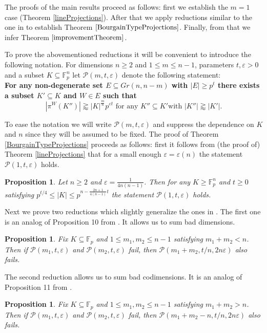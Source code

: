 \documentclass{amsart}
\newtheorem{proposition}[theorem]{Proposition}
\newcommand{\F}{\mathbb F}
\begin{document}
The proofs of the main results proceed as follows: first we establish the $m = 1$ case (Theorem \ref{lineProjections}). After that we apply reductions similar to the one in \cite{He18} to establish Theorem $\ref{BourgainTypeProjections}$. Finally, from that we infer Theorem $\ref{improvementTheorem}$.


To prove the abovementioned reductions it will be convenient to introduce the following notation. For dimensions $n \geq 2$ and $1 \leq m \leq n - 1$, parameters $t, \varepsilon > 0$ and a subset $K \subseteq \F_p^n$ let $\mathcal{P}(m, t, \varepsilon)$ denote the following statement: \\
\textbf{For any non-degenerate set $E \subseteq Gr(n, n - m)$ with $|E| \geq p^t$ there exists a subset $K' \subseteq K$ and $W \in E$ such that $$|\pi^{W}(K'')| \gtrapprox|K|^\frac{m}{n} p^{\varepsilon t} \text{ for any } K'' \subseteq K' \text {with } |K''| \gtrapprox |K'|.$$}

To ease the notation we will write $\mathcal{P}(m, t, \varepsilon)$ and suppress the dependence on $K$ and $n$ since they will be assumed to be fixed. The proof of Theorem \ref{BourgainTypeProjections} proceeds as follows: first it follows from (the proof of) Theorem \ref{lineProjections} that for a small enough $\varepsilon = \varepsilon(n)$ the statement $\mathcal{P}(1, t, \varepsilon)$ holds. 

\begin{proposition}\label{baseCase}
    Let $n \geq 2$ and $\varepsilon = \frac{1}{4n(n - 1)}$. Then for any $K \geq \F_p^n$ and $t \geq 0$ satisfying $p^{t/4} \leq |K| \leq p^{n - \frac{2n + 1}{4(n - 1)}t}$ the statement $\mathcal{P}(1, t, \varepsilon)$ holds. 
\end{proposition}

Next we prove two reductions which slightly generalize the ones in \cite{He18}.
The first one is an analog of Proposition 10 from \cite{He18}. It allows us to sum bad dimensions.

\begin{proposition}\label{additionofDimensionsProposition}
    Fix $K \subseteq \F_p$ and $1 \leq m_1, m_2 \leq n - 1$ satisfying $m_1 + m_2 < n$. Then if $\mathcal{P}(m_1, t, \varepsilon)$ and $\mathcal{P}(m_2, t, \varepsilon)$ fail, then $\mathcal{P}(m_1 + m_2, t/n, 2n\varepsilon)$ also fails.
\end{proposition}

The second reduction allows us to sum bad codimensions. It is an analog of Proposition 11 from \cite{He18}.
\begin{proposition}\label{additionofCodimensionsProposition}
Fix $K \subseteq \F_p$ and $1 \leq m_1, m_2 \leq n - 1$ satisfying $m_1 + m_2 > n$. Then if $\mathcal{P}(m_1, t, \varepsilon)$ and $\mathcal{P}(m_2, t, \varepsilon)$ fail, then $\mathcal{P}(m_1 + m_2 - n, t/n, 2n\varepsilon)$ also fails.   
\end{proposition}
\end{document}
